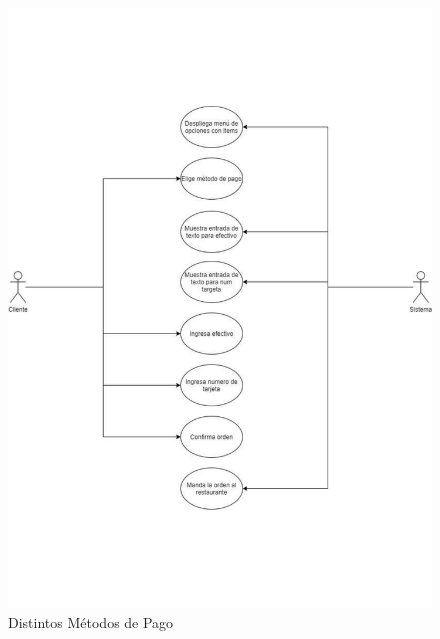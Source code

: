 \documentclass[conference]{IEEEtran}
\begin{document}
\begin{figure}[H]
\centering
\includegraphics[scale=0.24]{imagenes/Requerimiento9.pdf}
\caption{Distintos Métodos de Pago}
\end{figure}
\end{document}
